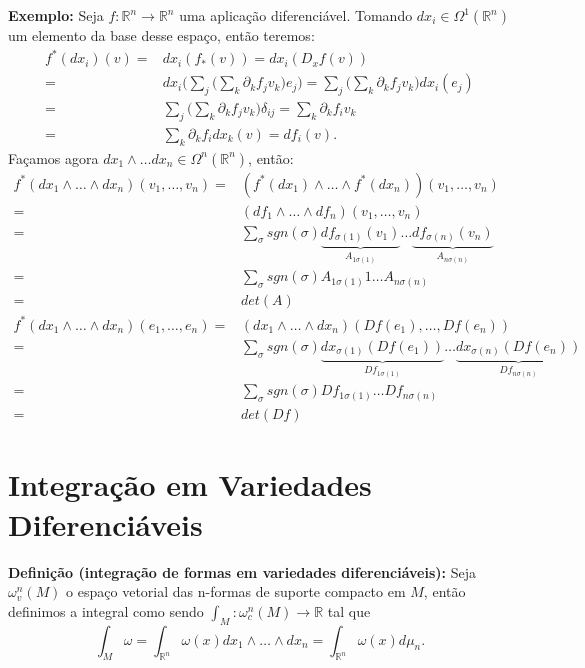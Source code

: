 \documentclass{article}
\begin{document}
	\vspace{2mm}
	\textbf{Exemplo:} Seja $f: \mathbb{R}^{n} \to \mathbb{R}^{n}$ uma aplicação diferenciável. Tomando $dx_{i} \in \Omega^{1}(\mathbb{R}^{n})$ um elemento da base desse espaço, então teremos:
	$$
	\begin{aligned}
	f^{*}(dx_{i})(v) =& dx_{i}(f_{*}(v)) = dx_{i}(D_{x}f(v))
	\\
	=& dx_{i} \Big(\sum_{j} \Big( \sum_{k} \partial_{k} f_{j}v_{k} \Big) e_{j}\Big) = \sum_{j} \Big( \sum_{k} \partial_{k} f_{j}v_{k} \Big) dx_{i}(e_{j}) 
	\\
	=& \sum_{j} \Big( \sum_{k} \partial_{k} f_{j}v_{k} \Big) \delta_{ij}  = \sum_{k} \partial_{k} f_{i}v_{k} 
	\\
	=& \sum_{k} \partial_{k} f_{i}dx_{k}(v) = df_{i}(v). 
	\end{aligned}
	$$
	Façamos agora $dx_{1} \wedge \dots  dx_{n} \in \Omega^{n}(\mathbb{R}^{n})$, então:
	$$
	\begin{aligned}
	f^{*}(dx_{1} \wedge \dots  \wedge dx_{n})(v_{1}, \dots, v_{n}) 
	=& (f^{*}(dx_{1}) \wedge \dots  \wedge f^{*}(dx_{n})) (v_{1}, \dots, v_{n}) 
	\\
	=& (df_{1} \wedge \dots  \wedge df_{n}) (v_{1}, \dots, v_{n}) 
	\\
	=& \sum_{\sigma} sgn(\sigma) \underbrace{df_{\sigma(1)}(v_{1})}_{A_{1\sigma(1)}} \dots \underbrace{ df_{\sigma(n)}(v_{n}) }_{A_{n\sigma(n)}}
	\\
	=& \sum_{\sigma} sgn(\sigma) A_{1\sigma(1)}1 \dots  A_{n\sigma(n)}
	\\
	=& det(A)
	\\
	f^{*}(dx_{1} \wedge \dots  \wedge dx_{n})(e_{1}, \dots, e_{n}) 
	=&  (dx_{1} \wedge \dots  \wedge dx_{n})(Df(e_{1}), \dots, Df(e_{n}))
	\\
	=& \sum_{\sigma} sgn(\sigma) \underbrace{dx_{\sigma(1)}(Df(e_{1}))}_{Df_{1\sigma(1)}} \dots \underbrace{ dx_{\sigma(n)}(Df(e_{n})) }_{Df_{n\sigma(n)}}
	\\
	=& \sum_{\sigma} sgn(\sigma) Df_{1\sigma(1)} \dots  Df_{n\sigma(n)}
	\\
	=& det(Df)
	\end{aligned}
	$$
	
	\section{Integração em Variedades Diferenciáveis}
	
	\textbf{Definição (integração de formas em variedades diferenciáveis):} Seja $\omega^{n}_{v}(M)$ o espaço vetorial das n-formas de suporte compacto em $M$, então definimos a integral como sendo $\int_{M} : \omega^{n}_{c}(M) \to \mathbb{R}$ tal que 
	$$
	\int_{M} \omega = \int_{\mathbb{R}^{n}} \omega(x)dx_{1} \wedge \dots \wedge dx_{n} = \int_{\mathbb{R}^{n}} \omega(x)d\mu_{n}.
	$$
	
\end{document}
